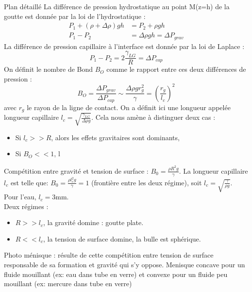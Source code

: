 \begin{reportBlock}{Plan détaillé}
  La différence de pression hydrostatique au point M(z=h) de la goutte est donnée par la loi de l'hydrostatique :
  \begin{align}
      P_1+(\rho+\Delta\rho)gh &= P_2+\rho gh \\
      P_1-P_2 &= \Delta\rho gh = \Delta P_{grav}
  \end{align}
  La différence de pression capillaire à l'interface est donnée par la loi de Laplace :
  \begin{equation}
      P_1-P_2 = 2\frac{\gamma_{LG}}{R} = \Delta P_{cap}
  \end{equation}
  On définit le nombre de Bond $B_O$ comme le rapport entre ces deux différences de pression :
  \begin{equation}
     B_O = \frac{\Delta P_{grav}}{\Delta P_{cap}}\sim \frac{\Delta\rho gr_g^2}{\gamma} = \left(\frac{r_g}{l_c}\right)^2
  \end{equation}
  avec $r_g$ le rayon de la ligne de contact. On a définit ici une longueur appelée longueur capillaire $l_c=\sqrt{\frac{\gamma_{LG}}{\Delta\rho g}}$.
  Cela nous amène à distinguer deux cas :
  \begin{itemize}
      \item Si $l_c>>R$, alors les effets gravitaires sont dominants,
      \item Si $B_O<<1$, l
  \end{itemize}
  Compétition entre gravité et tension de surface : $B_0=\frac{\rho R^2g}{\gamma}$. La longueur capillaire $l_c$ est telle que: $B_0=\frac{\rho l_c^2g}{\gamma}=1$ (frontière entre les deux régime), soit $l_c = \sqrt{\frac{\gamma}{\rho g}}$.
  Pour l'eau, $l_c=3$mm.\\
  Deux régimes : 
  \begin{itemize}
      \item $R>>l_c$, la gravité domine : goutte plate.
      \item $R<<l_c$, la tension de surface domine, la bulle est sphérique.
  \end{itemize}
  Photo ménisque : résulte de cette compétition entre tension de surface responsable de sa formation et gravité qui s'y oppose. Menisque concave pour un fluide mouillant (ex: eau dans tube en verre) et convexe pour un fluide peu mouillant (ex: mercure dans tube en verre)
  \begin{center}

\end{center}
\end{reportBlock}
